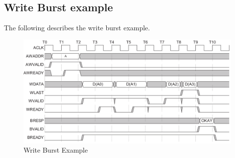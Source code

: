 \documentclass{article}
\begin{document}
\subsection{Write Burst example}
\quad The following describes the write burst example.
\begin{figure}[H]
    \centering
    \includegraphics[width=1\textwidth]{./Resources/writeBurstExample.png}
    \caption{Write Burst Example}
\end{figure}
\end{document}
